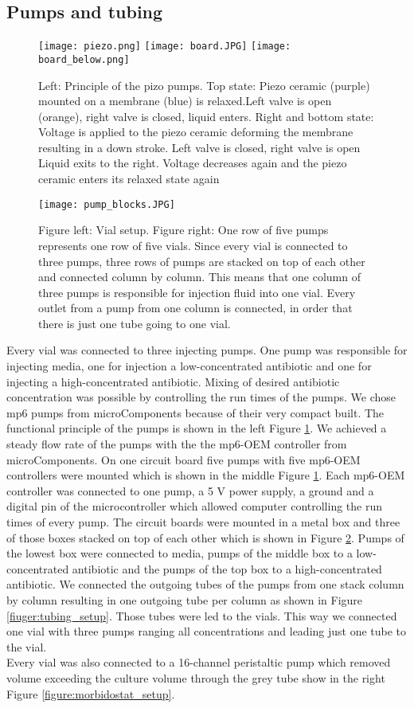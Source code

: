 \subsection{Pumps and tubing} 
\begin{figure}
	\texttt{[image: piezo.png]}
	\texttt{[image: board.JPG]}
	\texttt{[image: board\_below.png]}
	\caption{Left: Principle of the pizo pumps. Top state: Piezo ceramic (purple) mounted on a membrane (blue) is relaxed.Left valve is open (orange), right valve  is closed, liquid enters. Right and bottom state: Voltage is applied to the piezo ceramic deforming the membrane resulting in a down stroke. Left valve is closed, right valve is open Liquid exits to the right. Voltage decreases again and the piezo ceramic enters its relaxed state again \cite{piezo_pumps}}
	\label{figure:pumps}
\end{figure}
\begin{figure}
	\texttt{[image: pump\_blocks.JPG]}
	\caption{Figure left: Vial setup. Figure right: One row of five pumps represents one row of five vials. Since every vial is connected to three pumps, three rows of pumps are stacked on top of each other and connected column by column. This means that one column of three pumps is responsible for injection fluid into one vial. Every outlet from a pump from one column is connected, in order that there is just one tube going to one vial. }
	\label{figure:tubing_setup}
\end{figure}
Every vial was connected to three injecting pumps. One pump was responsible for injecting media, one for injection a low-concentrated antibiotic and one for injecting a high-concentrated antibiotic. Mixing of desired antibiotic concentration was possible by controlling the run times of the pumps.
We chose mp6 pumps from microComponents because of their very compact built. The functional principle of the pumps is shown in the left Figure \ref{figure:pumps}. We achieved a steady flow rate of the pumps with the the mp6-OEM controller from microComponents. On one circuit board five pumps with five mp6-OEM controllers were mounted which is shown in the middle Figure \ref{figure:pumps}. Each mp6-OEM controller was connected to one pump, a 5 V power supply, a ground and a digital pin of  the microcontroller which allowed computer controlling the run times of every pump. The circuit boards were mounted in a metal box and three of those boxes stacked on top of each other which is shown in Figure \ref{figure:tubing_setup}. Pumps of the lowest box were connected to media, pumps of the middle box to a low-concentrated antibiotic and the pumps of the top box to a high-concentrated antibiotic. We connected the outgoing tubes of the pumps from one stack column by column resulting in one outgoing tube per column as shown in Figure \ref{fiuger:tubing_setup}. Those tubes were led to the vials. This way we connected one vial with three pumps ranging all concentrations and leading just one tube to the vial.\\
Every vial was also connected to a 16-channel peristaltic pump which removed volume exceeding the culture volume through the grey tube show in the right Figure \ref{figure:morbidostat_setup}. 

